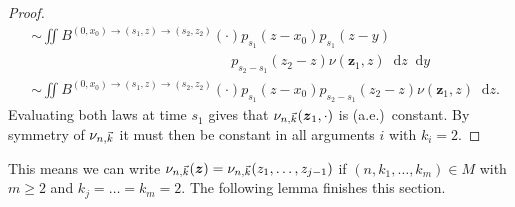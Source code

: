 \documentclass[reqno,draft]{amsart}
\numberwithin{equation}{section}
\theoremstyle{plain}
\theoremstyle{remark}
\newcommand*\diff{\mathop{}\!\mathrm{d}}
\newcommand{\mergers}{M}
\newcommand{\nunk}{\nu_{n,\smash{\vec{k}}}}
\newcommand{\gnk}{\nu_{n,\smash{\vec{k}}}}
\begin{document}
\begin{proof}
\begin{align*}
        &\sim \iint B^{(0,x_0)\to(s_1,z)\to(s_2,z_2)}(\cdot ) p_{s_1}(z-x_0) p_{s_1}(z-y)\\[-5pt]
        &\hspace{6cm} p_{s_2-s_1}(z_2-z) \nu(\boldsymbol z_1,z) \diff z \diff y\\
        &\sim \iint B^{(0,x_0)\to(s_1,z)\to(s_2,z_2)}(\cdot ) p_{s_1}(z-x_0) p_{s_2-s_1}(z_2-z) \nu(\boldsymbol z_1,z) \diff z.
    \end{align*}
    Evaluating both laws at time $s_1$ gives that $\gnk(\boldsymbol z_1,\cdot )$ is (a.e.)\ constant. By symmetry of $\gnk$ it must then be constant in all arguments $i$ with $k_i = 2$.
\end{proof}

This means we can write $\nunk(\boldsymbol z) = \nunk( z_1, \ldots , z_{j-1})$ if $(n,k_1, \ldots ,k_m)\in \mergers$ with $m\ge 2$ and $k_j=\ldots =k_m=2$. The following lemma finishes this section.  %
\end{document}
